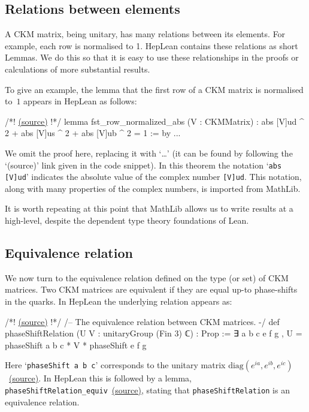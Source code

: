 \documentclass[a4paper, 11pt]{article}
\newcommand{\codeLink}[1]{
  \vspace{-0.5cm}\hfill\href{https://github.com/HEPLean/HepLean/blob/1b951994ae3d882242b02d23957ef1ee7fa05f3d/HepLean/#1}{(source)}
  }
\newcommand{\textLinkB}[1]{\href{https://github.com/HEPLean/HepLean/blob/1b951994ae3d882242b02d23957ef1ee7fa05f3d/HepLean/#1}{(source)}}
\begin{document}
\subsection{Relations between elements} 

A CKM matrix, being unitary, has many relations between its elements. 
For example, each row is normalised to 1. 
HepLean contains these relations as short Lemmas. We do this so that it is easy to use these relationships in the proofs or calculations of more substantial results. 

To give an example, the lemma that the first row of a CKM matrix is normalised to~$1$ appears in HepLean as follows:
\begin{code}
/*!\codeLink{FlavorPhysics/CKMMatrix/Relations.lean\#L40}!*/
lemma fst_row_normalized_abs (V : CKMMatrix) : 
    abs [V]ud ^ 2 + abs [V]us ^ 2 + abs [V]ub ^ 2 = 1 := by
  ...
\end{code}
We omit the proof here, replacing it with `\ldots' (it can be found by following the `(source)' link given in the code snippet). In this theorem the notation `\lstinline|abs [V]ud|' indicates the absolute value of the complex number  \lstinline|[V]ud|. This notation, along with many properties of the complex numbers, is imported from MathLib.

It is worth repeating at this point that MathLib allows us to write results at a high-level, 
despite the dependent type theory foundations of Lean.

\subsection{Equivalence relation} 
We now turn to the equivalence relation defined on the type (or set) of CKM matrices. Two CKM matrices are equivalent if they are equal up-to phase-shifts in the quarks. In HepLean the underlying relation appears as:
\begin{code}
/*!\codeLink{FlavorPhysics/CKMMatrix/Basic.lean\#L70}!*/
/-- The equivalence relation between CKM matrices. -/
def phaseShiftRelation (U V : unitaryGroup (Fin 3) ℂ) : Prop :=
  ∃ a b c e f g , U = phaseShift a b c * V * phaseShift e f g
\end{code}
Here `\lstinline|phaseShift a b c|' corresponds to the unitary matrix $\mathrm{diag}(e^{ia}, e^{ib}, e^{ic})$~\textLinkB{FlavorPhysics/CKMMatrix/Basic.lean\#L70}.
In HepLean this is followed by a lemma, \lstinline|phaseShiftRelation_equiv|~\textLinkB{FlavorPhysics/CKMMatrix/Basic.lean\#L57},  stating that  \lstinline|phaseShiftRelation| is an equivalence relation.
\end{document}
